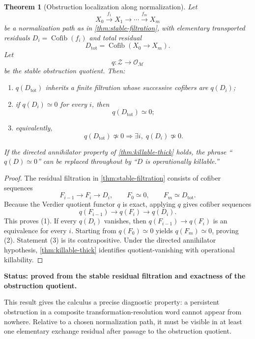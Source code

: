 \documentclass[11pt]{article}
\newtheorem{theorem}{Theorem}[section]
\theoremstyle{definition}
\theoremstyle{remark}
\newcommand{\Cofib}{\operatorname{Cofib}}
\newcommand{\status}[1]{\textbf{Status: #1.}}
\begin{document}
\begin{theorem}[Obstruction localization along normalization]\label{thm:obstruction-localization}
Let
\[
X_0\xrightarrow{f_1}X_1\xrightarrow{}\cdots\xrightarrow{f_m}X_m
\]
be a normalization path as in \cref{thm:stable-filtration}, with elementary transported residuals $D_i=\Cofib(f_i)$ and total residual
\[
D_{\mathrm{tot}}=\Cofib(X_0\to X_m).
\]
Let
\[
q:\mathcal Z\to\mathcal O_{\mathscr M}
\]
be the stable obstruction quotient. Then:
\begin{enumerate}
    \item $q(D_{\mathrm{tot}})$ inherits a finite filtration whose successive cofibers are $q(D_i)$;
    \item if $q(D_i)\simeq0$ for every $i$, then
    \[
    q(D_{\mathrm{tot}})\simeq0;
    \]
    \item equivalently,
    \[
    q(D_{\mathrm{tot}})\not\simeq0
    \Longrightarrow
    \exists i,\;q(D_i)\not\simeq0.
    \]
\end{enumerate}
If the directed annihilator property of \cref{thm:killable-thick} holds, the phrase ``$q(D)\simeq0$'' can be replaced throughout by ``$D$ is operationally killable.''
\end{theorem}

\begin{proof}
The residual filtration in \cref{thm:stable-filtration} consists of cofiber sequences
\[
F_{i-1}\longrightarrow F_i\longrightarrow D_i,
\qquad
F_0\simeq0,
\qquad
F_m\simeq D_{\mathrm{tot}}.
\]
Because the Verdier quotient functor $q$ is exact, applying $q$ gives cofiber sequences
\[
q(F_{i-1})\longrightarrow q(F_i)\longrightarrow q(D_i).
\]
This proves (1). If every $q(D_i)$ vanishes, then $q(F_{i-1})\to q(F_i)$ is an equivalence for every $i$. Starting from $q(F_0)\simeq0$ yields $q(F_m)\simeq0$, proving (2). Statement (3) is its contrapositive. Under the directed annihilator hypothesis, \cref{thm:killable-thick} identifies quotient-vanishing with operational killability.
\end{proof}

\status{proved from the stable residual filtration and exactness of the obstruction quotient}

This result gives the calculus a precise diagnostic property: a persistent obstruction in a composite transformation-resolution word cannot appear from nowhere. Relative to a chosen normalization path, it must be visible in at least one elementary exchange residual after passage to the obstruction quotient.
\end{document}
